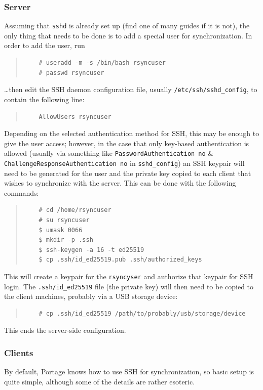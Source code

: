 \documentclass{article}
\begin{document}
\subsubsection{Server} Assuming that \texttt{sshd} is already set up (find one of many guides if it is not), the only thing that needs to be done is to add a special user for synchronization.  In order to add the user, run
\begin{quote}
\begin{verbatim}
	# useradd -m -s /bin/bash rsyncuser
	# passwd rsyncuser
\end{verbatim}
\end{quote}
\ldots then edit the SSH daemon configuration file, usually \texttt{/etc/ssh/sshd_config}, to contain the following line:
\begin{quote}
\begin{verbatim}
	AllowUsers rsyncuser
\end{verbatim}
\end{quote}
Depending on the selected authentication method for SSH, this may be enough to give the user access; however, in the case that only key-based authentication is allowed (usually via something like \texttt{PasswordAuthentication no} \& \texttt{ChallengeResponseAuthentication no} in \texttt{sshd_config}) an SSH keypair will need to be generated for the user and the private key copied to each client that wishes to synchronize with the server.  This can be done with the following commands:
\begin{quote}
\begin{verbatim}
	# cd /home/rsyncuser
	# su rsyncuser
	$ umask 0066
	$ mkdir -p .ssh
	$ ssh-keygen -a 16 -t ed25519
	$ cp .ssh/id_ed25519.pub .ssh/authorized_keys
\end{verbatim}
\end{quote}
This will create a keypair for the \texttt{rsyncyser} and authorize that keypair for SSH login.  The \texttt{.ssh/id_ed25519} file (the private key) will then need to be copied to the client machines, probably via a USB storage device:
\begin{quote}
\begin{verbatim}
	# cp .ssh/id_ed25519 /path/to/probably/usb/storage/device
\end{verbatim}
\end{quote}

This ends the server-side configuration.

\subsubsection{Clients}
By default, Portage knows how to use SSH for synchronization, so basic setup is quite simple, although some of the details are rather esoteric.
\end{document}
